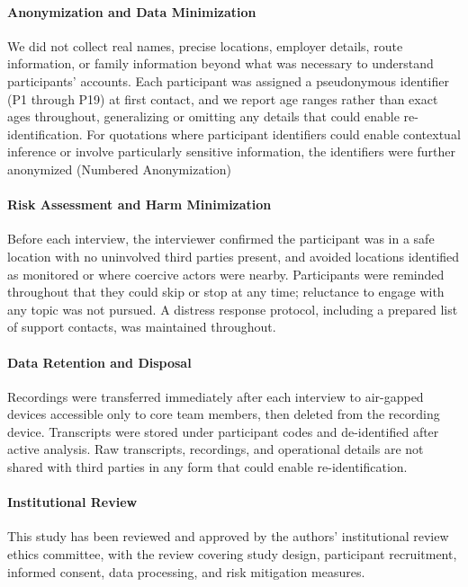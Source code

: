 \documentclass[conference,compsoc]{IEEEtran}
\begin{document}
\paragraph{\textbf{Anonymization and Data Minimization}}
We did not collect real names, precise locations, employer details, route information, or family information beyond what was necessary to understand participants' accounts. Each participant was assigned a pseudonymous identifier (P1 through P19) at first contact, and we report age ranges rather than exact ages throughout, generalizing or omitting any details that could enable re-identification. For quotations where participant identifiers could enable contextual inference or involve particularly sensitive information, the identifiers were further anonymized (Numbered Anonymization) 

\paragraph{\textbf{Risk Assessment and Harm Minimization}}
Before each interview, the interviewer confirmed the participant was in a safe location with no uninvolved third parties present, and avoided locations identified as monitored or where coercive actors were nearby. Participants were reminded throughout that they could skip or stop at any time; reluctance to engage with any topic was not pursued. A distress response protocol, including a prepared list of support contacts, was maintained throughout.









\paragraph{\textbf{Data Retention and Disposal}}
Recordings were transferred immediately after each interview to air-gapped devices accessible only to core team members, then deleted from the recording device. Transcripts were stored under participant codes and de-identified after active analysis. Raw transcripts, recordings, and operational details are not shared with third parties in any form that could enable re-identification.

\paragraph{\textbf{Institutional Review}}
This study has been reviewed and approved by the authors' institutional review ethics committee, with the review covering study design, participant recruitment, informed consent, data processing, and risk mitigation measures.
\end{document}
